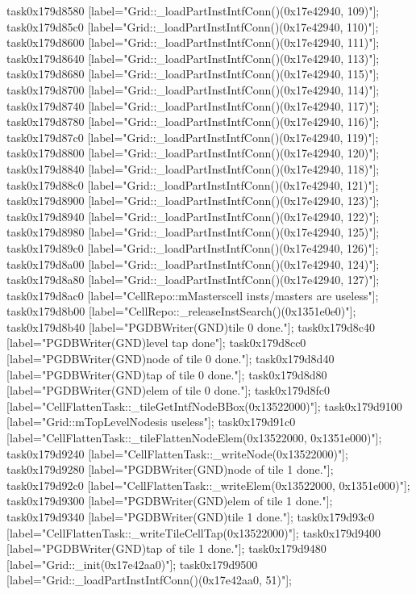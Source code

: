 {	task0x179d8580 [label="Grid::_loadPartInstIntfConn()(0x17e42940, 109)"];
	task0x179d85c0 [label="Grid::_loadPartInstIntfConn()(0x17e42940, 110)"];
	task0x179d8600 [label="Grid::_loadPartInstIntfConn()(0x17e42940, 111)"];
	task0x179d8640 [label="Grid::_loadPartInstIntfConn()(0x17e42940, 113)"];
	task0x179d8680 [label="Grid::_loadPartInstIntfConn()(0x17e42940, 115)"];
	task0x179d8700 [label="Grid::_loadPartInstIntfConn()(0x17e42940, 114)"];
	task0x179d8740 [label="Grid::_loadPartInstIntfConn()(0x17e42940, 117)"];
	task0x179d8780 [label="Grid::_loadPartInstIntfConn()(0x17e42940, 116)"];
	task0x179d87c0 [label="Grid::_loadPartInstIntfConn()(0x17e42940, 119)"];
	task0x179d8800 [label="Grid::_loadPartInstIntfConn()(0x17e42940, 120)"];
	task0x179d8840 [label="Grid::_loadPartInstIntfConn()(0x17e42940, 118)"];
	task0x179d88c0 [label="Grid::_loadPartInstIntfConn()(0x17e42940, 121)"];
	task0x179d8900 [label="Grid::_loadPartInstIntfConn()(0x17e42940, 123)"];
	task0x179d8940 [label="Grid::_loadPartInstIntfConn()(0x17e42940, 122)"];
	task0x179d8980 [label="Grid::_loadPartInstIntfConn()(0x17e42940, 125)"];
	task0x179d89c0 [label="Grid::_loadPartInstIntfConn()(0x17e42940, 126)"];
	task0x179d8a00 [label="Grid::_loadPartInstIntfConn()(0x17e42940, 124)"];
	task0x179d8a80 [label="Grid::_loadPartInstIntfConn()(0x17e42940, 127)"];
	task0x179d8ac0 [label="CellRepo::mMasters\nAll cell insts/masters are useless"];
	task0x179d8b00 [label="CellRepo::_releaseInstSearch()(0x1351e0e0)"];
	task0x179d8b40 [label="PGDBWriter(GND)\nCell tile 0 done."];
	task0x179d8c40 [label="PGDBWriter(GND)\nTop level tap done"];
	task0x179d8cc0 [label="PGDBWriter(GND)\nCell node of tile 0 done."];
	task0x179d8d40 [label="PGDBWriter(GND)\nCell tap of tile 0 done."];
	task0x179d8d80 [label="PGDBWriter(GND)\nCell elem of tile 0 done."];
	task0x179d8fc0 [label="CellFlattenTask::_tileGetIntfNodeBBox(0x13522000)"];
	task0x179d9100 [label="Grid::mTopLevelNodes\nGND is useless"];
	task0x179d91c0 [label="CellFlattenTask::_tileFlattenNodeElem(0x13522000, 0x1351e000)"];
	task0x179d9240 [label="CellFlattenTask::_writeNode(0x13522000)"];
	task0x179d9280 [label="PGDBWriter(GND)\nCell node of tile 1 done."];
	task0x179d92c0 [label="CellFlattenTask::_writeElem(0x13522000, 0x1351e000)"];
	task0x179d9300 [label="PGDBWriter(GND)\nCell elem of tile 1 done."];
	task0x179d9340 [label="PGDBWriter(GND)\nCell tile 1 done."];
	task0x179d93c0 [label="CellFlattenTask::_writeTileCellTap(0x13522000)"];
	task0x179d9400 [label="PGDBWriter(GND)\nCell tap of tile 1 done."];
	task0x179d9480 [label="Grid::_init(0x17e42aa0)"];
	task0x179d9500 [label="Grid::_loadPartInstIntfConn()(0x17e42aa0, 51)"];
}
